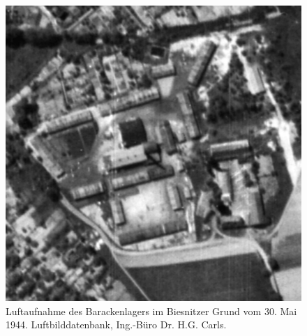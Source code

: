 \begin{flushleft}
    \setlength{\fboxsep}{0pt}
\begin{figure}
	\includegraphics[width=.99\linewidth]{images/lager0.jpg}
	\caption[Luftaufnahme des Lagers, 30. Mai 1945]{Luftaufnahme des Barackenlagers im Biesnitzer Grund vom 30. Mai 1944. Luftbilddatenbank, Ing.-Büro Dr. H.G. Carls.}
\end{figure}
\end{flushleft}